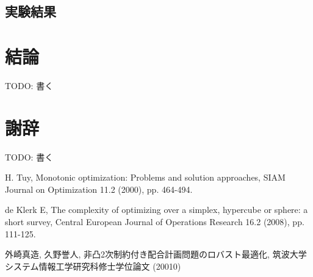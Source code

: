 \documentclass[a4paper,11pt]{jreport}
\begin{document}
\section{実験結果}

\chapter{結論}

TODO: 書く

\chapter*{謝辞}

TODO: 書く

\newpage

\renewcommand{\bibname}{参考文献}

\begin{thebibliography}{1}

H. Tuy,
\newblock Monotonic optimization: Problems and solution approaches,
\newblock SIAM Journal on Optimization 11.2 (2000), pp. 464-494.

de Klerk E,
\newblock The complexity of optimizing over a simplex, hypercube or sphere: a short survey,
\newblock Central European Journal of Operations Research 16.2 (2008), pp. 111-125.

外崎真造, 久野誉人,
\newblock 非凸2次制約付き配合計画問題のロバスト最適化,
\newblock 筑波大学システム情報工学研究科修士学位論文 (20010)
\end{thebibliography}
\end{document}
